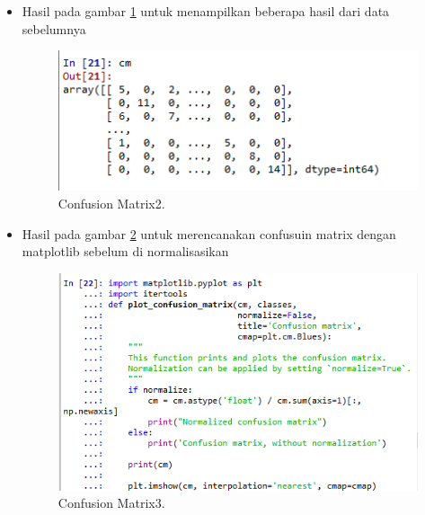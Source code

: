 \begin{enumerate}
\begin{itemize}
\item Hasil pada gambar \ref{mat2} untuk menampilkan beberapa hasil dari data sebelumnya
 		\begin{figure}[ht]
		\centerline{\includegraphics[width=1\textwidth]{figures/im/mat2.png}}
		\caption{Confusion Matrix2.}
		\label{mat2}
		\end{figure}

\item Hasil pada gambar \ref{mat3} untuk merencanakan confusuin matrix dengan matplotlib sebelum di normalisasikan
 		\begin{figure}[ht]
		\centerline{\includegraphics[width=1\textwidth]{figures/im/mat3.png}}
		\caption{Confusion Matrix3.}
		\label{mat3}
		\end{figure}


\end{itemize}
\end{enumerate}
